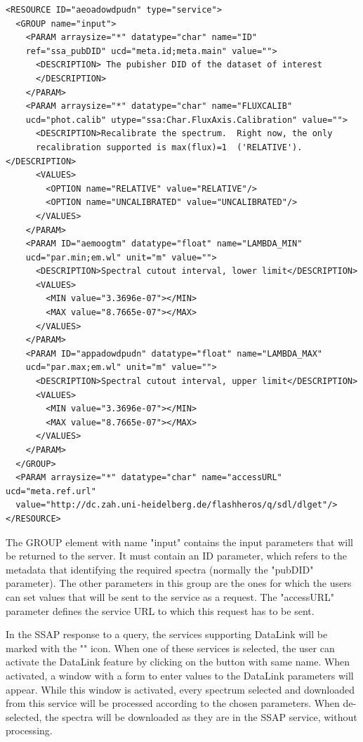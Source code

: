 \documentclass[final,authoryear,5p,times,twocolumn]{elsarticle}
\begin{document}
{\tiny
\begin{minipage}{\textwidth}
\begin{verbatim}
<RESOURCE ID="aeoadowdpudn" type="service">
  <GROUP name="input">
    <PARAM arraysize="*" datatype="char" name="ID"
    ref="ssa_pubDID" ucd="meta.id;meta.main" value="">
      <DESCRIPTION> The pubisher DID of the dataset of interest
      </DESCRIPTION>
    </PARAM>
    <PARAM arraysize="*" datatype="char" name="FLUXCALIB"
    ucd="phot.calib" utype="ssa:Char.FluxAxis.Calibration" value="">
      <DESCRIPTION>Recalibrate the spectrum.  Right now, the only
      recalibration supported is max(flux)=1  ('RELATIVE').</DESCRIPTION>
      <VALUES>
        <OPTION name="RELATIVE" value="RELATIVE"/>
        <OPTION name="UNCALIBRATED" value="UNCALIBRATED"/>
      </VALUES>
    </PARAM>
    <PARAM ID="aemoogtm" datatype="float" name="LAMBDA_MIN"
    ucd="par.min;em.wl" unit="m" value="">
      <DESCRIPTION>Spectral cutout interval, lower limit</DESCRIPTION>
      <VALUES>
        <MIN value="3.3696e-07"></MIN>
        <MAX value="8.7665e-07"></MAX>
      </VALUES>
    </PARAM>
    <PARAM ID="appadowdpudn" datatype="float" name="LAMBDA_MAX"
    ucd="par.max;em.wl" unit="m" value="">
      <DESCRIPTION>Spectral cutout interval, upper limit</DESCRIPTION>
      <VALUES>
        <MIN value="3.3696e-07"></MIN>
        <MAX value="8.7665e-07"></MAX>
      </VALUES>
    </PARAM>
  </GROUP>
  <PARAM arraysize="*" datatype="char" name="accessURL" ucd="meta.ref.url"
  value="http://dc.zah.uni-heidelberg.de/flashheros/q/sdl/dlget"/>
</RESOURCE>
\end{verbatim}

\end{minipage}
}

The GROUP element with name "input" contains the input
parameters that will be returned to the server.  It must contain an ID
parameter, which refers to the metadata that identifying the required
spectra (normally the "pubDID" parameter).  The other parameters in
this group are the ones for which the users can set values that will
be sent to the service as a request. The "accessURL" parameter defines
the service URL to which this request has to be sent.

In the SSAP response to a query, the services supporting DataLink will
be marked with the  ""  icon. When one of these services is
selected, the user can activate the DataLink feature by clicking on
the button with same name. When activated, a window with a form to
enter values to the DataLink parameters will appear. While this window
is activated, every spectrum selected and downloaded from this service
will be processed according to the chosen parameters. When
de-selected, the spectra will be downloaded as they are in the SSAP
service, without processing.
\end{document}
